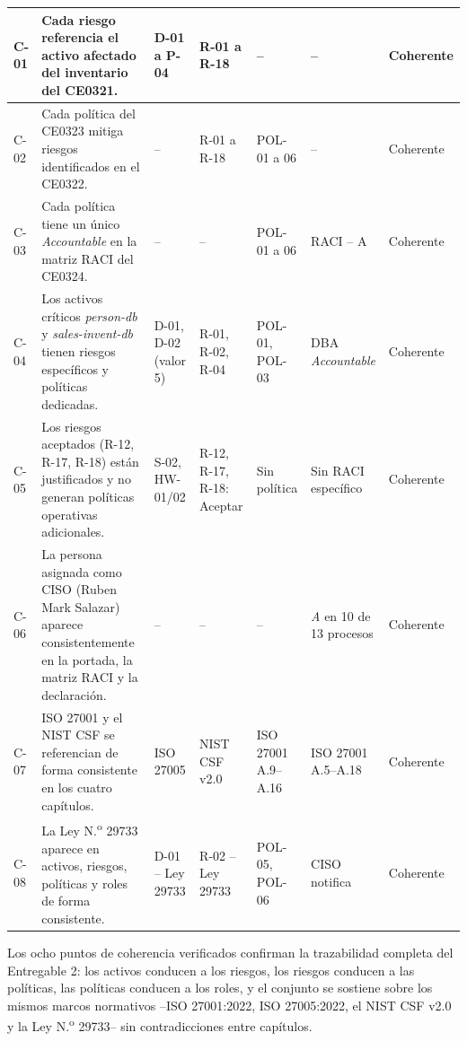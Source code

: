 \documentclass[11pt, a4paper, oneside]{report}
\begin{document}
\begin{landscape}
\begin{xltabular}{\linewidth}{@{}|L{0.9cm}|L{4.6cm}|L{1.8cm}|L{1.8cm}|L{1.8cm}|L{1.8cm}|L{1.8cm}|@{}}
{\small C-01} & {\small Cada riesgo referencia el activo afectado del inventario del CE0321.} & {\small D-01 a P-04} & {\small R-01 a R-18} & {\small --} & {\small --} & {\small Coherente} \\ \hline
{\small C-02} & {\small Cada política del CE0323 mitiga riesgos identificados en el CE0322.} & {\small --} & {\small R-01 a R-18} & {\small POL-01 a 06} & {\small --} & {\small Coherente} \\ \hline
{\small C-03} & {\small Cada política tiene un único \textit{Accountable} en la matriz RACI del CE0324.} & {\small --} & {\small --} & {\small POL-01 a 06} & {\small RACI -- A} & {\small Coherente} \\ \hline
{\small C-04} & {\small Los activos críticos \textit{person-db} y \textit{sales-invent-db} tienen riesgos específicos y políticas dedicadas.} & {\small D-01, D-02 (valor 5)} & {\small R-01, R-02, R-04} & {\small POL-01, POL-03} & {\small DBA \textit{Accountable}} & {\small Coherente} \\ \hline
{\small C-05} & {\small Los riesgos aceptados (R-12, R-17, R-18) están justificados y no generan políticas operativas adicionales.} & {\small S-02, HW-01/02} & {\small R-12, R-17, R-18: Aceptar} & {\small Sin política} & {\small Sin RACI específico} & {\small Coherente} \\ \hline
{\small C-06} & {\small La persona asignada como CISO (Ruben Mark Salazar) aparece consistentemente en la portada, la matriz RACI y la declaración.} & {\small --} & {\small --} & {\small --} & {\small \textit{A} en 10 de 13 procesos} & {\small Coherente} \\ \hline
{\small C-07} & {\small ISO 27001 y el NIST CSF se referencian de forma consistente en los cuatro capítulos.} & {\small ISO 27005} & {\small NIST CSF v2.0} & {\small ISO 27001 A.9--A.16} & {\small ISO 27001 A.5--A.18} & {\small Coherente} \\ \hline
{\small C-08} & {\small La Ley N.\textsuperscript{o} 29733 aparece en activos, riesgos, políticas y roles de forma consistente.} & {\small D-01 -- Ley 29733} & {\small R-02 -- Ley 29733} & {\small POL-05, POL-06} & {\small CISO notifica} & {\small Coherente} \\ \hline

\end{xltabular}

\normalsize
\end{landscape}

Los ocho puntos de coherencia verificados confirman la trazabilidad completa del Entregable 2: los activos conducen a los riesgos, los riesgos conducen a las políticas, las políticas conducen a los roles, y el conjunto se sostiene sobre los mismos marcos normativos --ISO 27001:2022, ISO 27005:2022, el NIST CSF v2.0 y la Ley N.\textsuperscript{o} 29733-- sin contradicciones entre capítulos.
\end{document}
